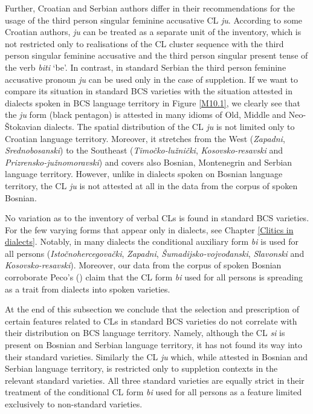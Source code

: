 Further, Croatian and Serbian authors differ in their recommendations for the usage of the third person singular feminine accusative CL \textit{ju}. According to some Croatian authors, \textit{ju} can be treated as a separate unit of the inventory, which is not restricted only to realisations of the CL cluster sequence with the third person singular feminine accusative and the third person singular present tense of the verb \textit{biti} ‘be’. In contrast, in standard Serbian the third person feminine accusative pronoun \textit{ju} can be used only in the case of suppletion. If we want to compare its situation in standard BCS varieties with the situation attested in dialects spoken in BCS language territory in Figure \ref{M10.1}, we clearly see that the \textit{ju }form (black pentagon) is attested in many idioms of Old, Middle and Neo-Štokavian dialects. The spatial distribution of the CL \textit{ju} is not limited only to Croatian language territory. Moreover, it stretches from the West (\textit{Zapadni},\textit{ Srednobosanski}) to the Southeast (\textit{Timočko-lužnički},\textit{ Kosovsko-resavski} and \textit{Prizrensko-južnomoravski}) and covers also Bosnian, Montenegrin and Serbian language territory. However, unlike in dialects spoken on Bosnian language territory, the CL \textit{ju} is not attested at all in the data from the corpus of spoken Bosnian. 

No variation as to the inventory of verbal CLs is found in standard BCS varieties. For the few varying forms that appear only in dialects, see Chapter \ref{Clitics in dialects}. Notably, in many dialects the conditional auxiliary form \textit{bi} is used for all persons (\textit{Istočnohercegovački}, \textit{Zapadni}, \textit{Šu\-ma\-dij\-sko-voj\-vo\-đan\-ski}, \textit{Slavonski} and \textit{Kosovsko-resavski}). Moreover, our data from the corpus of spoken Bosnian corroborate Peco's (\citeyear[331]{Peco07b}) claim that the CL form \textit{bi} used for all persons is spreading as a trait from dialects into spoken varieties. 

At the end of this subsection we conclude that the selection and prescription of certain features related to CLs in standard BCS varieties do not correlate with their distribution on BCS language territory. Namely, although the CL \textit{si} is present on Bosnian and Serbian language territory, it has not found its way into their standard varieties. Similarly the CL \textit{ju} which, while attested in Bosnian and Serbian language territory, is restricted only to suppletion contexts in the relevant standard varieties. All three standard varieties are equally strict in their treatment of the conditional CL form \textit{bi} used for all persons as a feature limited exclusively to non-standard varieties. 

